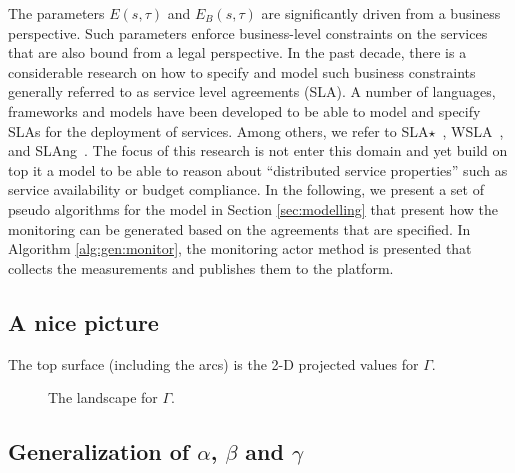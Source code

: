 The parameters $E(s,\tau)$ and $E_B(s,\tau)$ are significantly driven from a business perspective.
Such parameters enforce business-level constraints on the services that are also bound from a legal perspective.
In the past decade, there is a considerable research on how to specify and model such business constraints generally referred to as service level agreements (SLA).
A number of languages, frameworks and models have been developed to be able to model and specify SLAs for the deployment of services.
Among others, we refer to SLA$\star$~\cite{kearney2010sla}, WSLA~\cite{keller2003wsla}, and SLAng~\cite{lamanna2003slang}.
The focus of this research is not enter this domain and yet build on top it a model to be able to reason about ``distributed service properties'' such as service availability or budget compliance. 
In the following, we present a set of pseudo algorithms for the model in Section \ref{sec:modelling} that present how the monitoring can be generated based on the agreements that are specified. 
In Algorithm \ref{alg:gen:monitor}, the monitoring actor method  is presented that collects the measurements and publishes them to the platform.



% 

\subsection*{A nice picture}

The top surface (including the arcs) is the 2-D projected values for $\Gamma$.
% 
\begin{figure}[h]
\centering
{}
\caption{
The landscape for $\Gamma$.
} 
\label{fig:sustain:factor}
\end{figure}
% 

\subsection{Generalization of $\alpha$, $\beta$ and $\gamma$}

